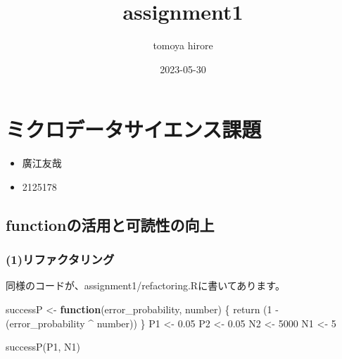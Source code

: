\documentclass[
]{article}
\title{assignment1}
\author{tomoya hirore}
\date{2023-05-30}
\newenvironment{Shaded}{\begin{snugshade}}{\end{snugshade}}
\newcommand{\ControlFlowTok}[1]{\textcolor[rgb]{0.13,0.29,0.53}{\textbf{#1}}}
\newcommand{\DecValTok}[1]{\textcolor[rgb]{0.00,0.00,0.81}{#1}}
\newcommand{\FloatTok}[1]{\textcolor[rgb]{0.00,0.00,0.81}{#1}}
\newcommand{\FunctionTok}[1]{\textcolor[rgb]{0.00,0.00,0.00}{#1}}
\newcommand{\NormalTok}[1]{#1}
\newcommand{\OtherTok}[1]{\textcolor[rgb]{0.56,0.35,0.01}{#1}}
\newcommand{\SpecialCharTok}[1]{\textcolor[rgb]{0.00,0.00,0.00}{#1}}
\providecommand{\tightlist}{%
  \setlength{\itemsep}{0pt}\setlength{\parskip}{0pt}}
\begin{document}
\maketitle

\hypertarget{ux30dfux30afux30edux30c7ux30fcux30bfux30b5ux30a4ux30a8ux30f3ux30b9ux8ab2ux984c}{%
\section{ミクロデータサイエンス課題}\label{ux30dfux30afux30edux30c7ux30fcux30bfux30b5ux30a4ux30a8ux30f3ux30b9ux8ab2ux984c}}

\begin{itemize}
\tightlist
\item
  廣江友哉
\item
  2125178
\end{itemize}

\hypertarget{functionux306eux6d3bux7528ux3068ux53efux8aadux6027ux306eux5411ux4e0a}{%
\subsection{functionの活用と可読性の向上}\label{functionux306eux6d3bux7528ux3068ux53efux8aadux6027ux306eux5411ux4e0a}}

\hypertarget{ux30eaux30d5ux30a1ux30afux30bfux30eaux30f3ux30b0}{%
\subsubsection{(1)リファクタリング}\label{ux30eaux30d5ux30a1ux30afux30bfux30eaux30f3ux30b0}}

同様のコードが、assignment1/refactoring.Rに書いてあります。

\begin{Shaded}
\begin{Highlighting}[]
\NormalTok{successP }\OtherTok{\textless{}{-}} \ControlFlowTok{function}\NormalTok{(error\_probability, number) \{}
  \FunctionTok{return}\NormalTok{ (}\DecValTok{1} \SpecialCharTok{{-}}\NormalTok{ (error\_probability }\SpecialCharTok{\^{}}\NormalTok{ number))}
\NormalTok{\}}
\NormalTok{P1 }\OtherTok{\textless{}{-}} \FloatTok{0.05}
\NormalTok{P2 }\OtherTok{\textless{}{-}} \FloatTok{0.05}
\NormalTok{N2 }\OtherTok{\textless{}{-}} \DecValTok{5000}
\NormalTok{N1 }\OtherTok{\textless{}{-}} \DecValTok{5}

\FunctionTok{successP}\NormalTok{(P1, N1)}
\end{Highlighting}
\end{Shaded}
\end{document}
